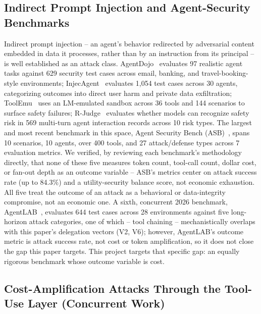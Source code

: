 \documentclass[conference]{IEEEtran}
\begin{document}
\subsection{Indirect Prompt Injection and Agent-Security Benchmarks}

Indirect prompt injection -- an agent's behavior redirected by adversarial content embedded in data it processes, rather than by an instruction from its principal -- is well established as an attack class. AgentDojo~\cite{debenedetti2024agentdojo} evaluates 97 realistic agent tasks against 629 security test cases across email, banking, and travel-booking-style environments; InjecAgent~\cite{zhan2024injecagent} evaluates 1,054 test cases across 30 agents, categorizing outcomes into direct user harm and private data exfiltration; ToolEmu~\cite{ruan2024toolemu} uses an LM-emulated sandbox across 36 tools and 144 scenarios to surface safety failures; R-Judge~\cite{yuan2024rjudge} evaluates whether models can recognize safety risk in 569 multi-turn agent interaction records across 10 risk types. The largest and most recent benchmark in this space, Agent Security Bench (ASB)~\cite{zhang2025asb}, spans 10 scenarios, 10 agents, over 400 tools, and 27 attack/defense types across 7 evaluation metrics. We verified, by reviewing each benchmark's methodology directly, that none of these five measures token count, tool-call count, dollar cost, or fan-out depth as an outcome variable -- ASB's metrics center on attack success rate (up to 84.3\%) and a utility-security balance score, not economic exhaustion. All five treat the outcome of an attack as a behavioral or data-integrity compromise, not an economic one. A sixth, concurrent 2026 benchmark, AgentLAB~\cite{jiang2026agentlab}, evaluates 644 test cases across 28 environments against five long-horizon attack categories, one of which -- tool chaining -- mechanistically overlaps with this paper's delegation vectors (V2, V6); however, AgentLAB's outcome metric is attack success rate, not cost or token amplification, so it does not close the gap this paper targets. This project targets that specific gap: an equally rigorous benchmark whose outcome variable is cost.

\subsection{Cost-Amplification Attacks Through the Tool-Use Layer (Concurrent Work)}
\label{sec:concurrent}
\end{document}
